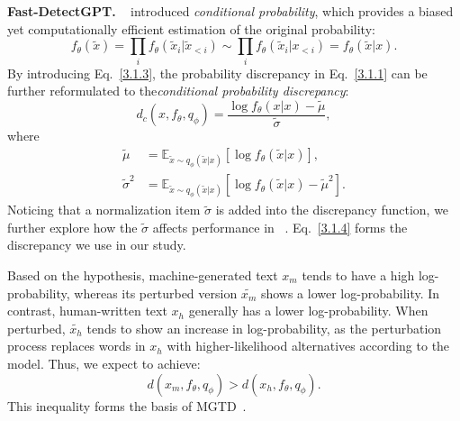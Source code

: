 \noindent \textbf{Fast-DetectGPT. }~\cite{fastdetectgpt} introduced \textit{conditional probability}, which provides a biased yet computationally efficient estimation of the original probability:
\begin{equation}
    f_\theta(\tilde{x}) = \prod_{i}f_\theta(\tilde{x}_i|\tilde{x}_{<i}) \sim \prod_{i}f_\theta(\tilde{x}_i|x_{<i}) = f_\theta(\tilde{x}|x).
    \label{3.1.3}
\end{equation}
%
By introducing Eq.~\eqref{3.1.3}, the probability discrepancy in Eq.~\eqref{3.1.1} can be further reformulated to the\textit{conditional probability discrepancy}:
\begin{equation}
    d_c(x, f_\theta, q_\phi) = \frac{\log f_\theta(x|x) - \tilde{\mu}}{\tilde{\sigma}},
    \label{3.1.4}
\end{equation}
where
\begin{equation}
\begin{aligned}
    \tilde{\mu} &= \mathbb E_{\tilde{x}\sim q_\phi(\tilde{x}|x)}[\log f_\theta (\tilde{x}|x)],\\
    \tilde{\sigma}^2 &= \mathbb E_{\tilde{x}\sim q_\phi(\tilde{x}|x)}[\log f_\theta (\tilde{x}|x) - \tilde{\mu}^2].
\end{aligned}
\label{3.1.5}
\end{equation}
%
Noticing that a normalization item $\tilde{\sigma}$ is added into the discrepancy function, we further explore how the $\tilde{\sigma}$ affects performance in ~.
%
%
Eq.~\eqref{3.1.4} forms the discrepancy we use in our study.

Based on the hypothesis, machine-generated text $x_m$ tends to have a high log-probability, whereas its perturbed version $\tilde{x_m}$ shows a lower log-probability.
%
In contrast, human-written text $x_h$ generally has a lower log-probability.
%
When perturbed, $\tilde{x_h}$ tends to show an increase in log-probability, as the perturbation process replaces words in $x_h$ with higher-likelihood alternatives according to the model.
%
Thus, we expect to achieve:
\begin{equation}
    d(x_m, f_\theta, q_\phi) > d(x_h, f_\theta, q_\phi).
    \label{3.1.2}
\end{equation}
%
This inequality forms the basis of MGTD~\cite{detectgpt, fastdetectgpt, imbd}.

